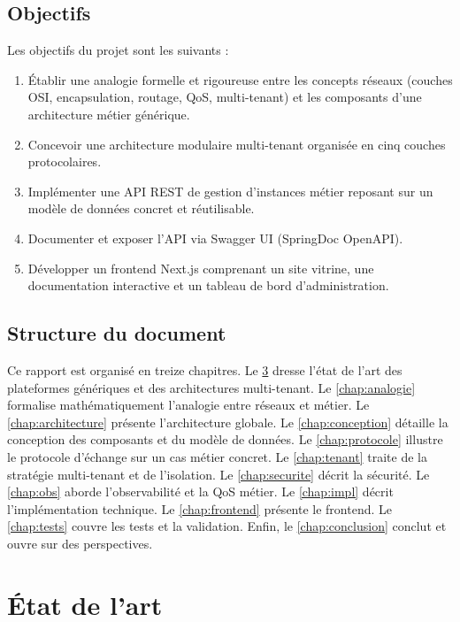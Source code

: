 \documentclass[12pt,a4paper]{report}
\theoremstyle{definition}
\theoremstyle{remark}
\newcommand{\api}{\textsc{API}}
\newcommand{\osi}{\textsc{OSI}}
\newcommand{\rest}{\textsc{REST}}
\begin{document}
\section{Objectifs}

Les objectifs du projet sont les suivants :
\begin{enumerate}
	\item Établir une analogie formelle et rigoureuse entre les concepts réseaux (couches \osi, encapsulation, routage, QoS, multi-tenant) et les composants d'une architecture métier générique.
	\item Concevoir une architecture modulaire multi-tenant organisée en cinq couches protocolaires.
	\item Implémenter une \api{} \rest{} de gestion d'instances métier reposant sur un modèle de données concret et réutilisable.
	\item Documenter et exposer l'\api{} via Swagger UI (SpringDoc OpenAPI).
	\item Développer un frontend Next.js comprenant un site vitrine, une documentation interactive et un tableau de bord d'administration.
\end{enumerate}

\section{Structure du document}

Ce rapport est organisé en treize chapitres. Le \cref{chap:etat} dresse l'état de l'art des plateformes génériques et des architectures multi-tenant. Le \cref{chap:analogie} formalise mathématiquement l'analogie entre réseaux et métier. Le \cref{chap:architecture} présente l'architecture globale. Le \cref{chap:conception} détaille la conception des composants et du modèle de données. Le \cref{chap:protocole} illustre le protocole d'échange sur un cas métier concret. Le \cref{chap:tenant} traite de la stratégie multi-tenant et de l'isolation. Le \cref{chap:securite} décrit la sécurité. Le \cref{chap:obs} aborde l'observabilité et la QoS métier. Le \cref{chap:impl} décrit l'implémentation technique. Le \cref{chap:frontend} présente le frontend. Le \cref{chap:tests} couvre les tests et la validation. Enfin, le \cref{chap:conclusion} conclut et ouvre sur des perspectives.

\chapter{État de l'art}
\label{chap:etat}
\end{document}
